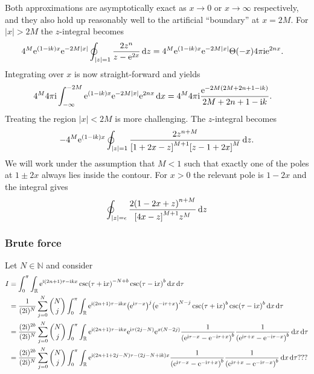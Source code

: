 \documentclass[english, parskip=full]{scrartcl}
\begin{document}
Both approximations are asymptotically exact as $x\rightarrow 0$ or $x\rightarrow \infty$ respectively, and they also hold up reasonably well to the artificial ``boundary'' at $x=2M$.
For $|x|>2M$ the $z$-integral becomes
\begin{align}
4^M \text{e}^{(1-\text{i} k)x} \text{e}^{-2M|x|} \oint_{|z|=1} \frac{2z^n}{z-\text{e}^{2x}}\,\text{d} z &= 4^M \text{e}^{(1-\text{i} k)x} \text{e}^{-2M|x|} \Theta(-x) 4\pi\text{i} \text{e}^{2nx}.
\end{align}
Integrating over $x$ is now straight-forward and yields
\begin{align}
4^M 4\pi\text{i} \int_{-\infty}^{-2M} \text{e}^{(1-\text{i} k)x} \text{e}^{-2M|x|} \text{e}^{2nx} \,\mathrm{d}x &= 4^M 4\pi\text{i} \frac{\text{e}^{-2M (2M + 2n + 1 - \text{i} k)}}{2M + 2n + 1 - \text{i} k}.
\end{align}
Treating the region $|x|<2M$ is more challenging.
The $z$-integral becomes
\begin{align}
-4^M \powe{(1-\i k) x} \oint_{|z|=1} \frac{2 z^{n+M}}{\klb*{1+2x-z}^{M+1} \klb*{z - 1 + 2x}^M} \,\d z.
\end{align}
We will work under the assumption that $M<1$ such that exactly one of the poles at $1 \pm 2x$ always lies inside the contour.
For $x>0$ the relevant pole is $1 - 2x$ and the integral gives
\begin{align}
\oint_{|z|=\epsilon} \frac{2 \kla*{1-2x + z}^{n+M} }{\klb*{4x - z}^{M+1} z^M}\,\d z
\end{align}
\subsubsection{Brute force}
Let $N\in\mathbb{N}$ and consider
\begin{align}
I &= \intx{0}{\pi}{\intr{\powe{\i (2n+1)\tau - \i kx} \csc (\tau + \i x)^{-N+b} \csc(\tau - \i x)^b}{x} }{\tau}\\
&= \frac{1}{(2\i)^N} \sum_{j=0}^N\binom{N}{j} \intx{0}{\pi}{\intr{\powe{\i (2n+1)\tau - \i kx} \kla*{\powe{\i\tau - x}}^j \kla*{\powe{-\i\tau + x}}^{N-j} \csc\kla*{\tau + \i x}^b \csc\kla*{\tau - \i x}^b}{x} }{\tau}\\
&= \frac{(2\i)^{2b}}{(2\i)^N} \sum_{j=0}^N\binom{N}{j} \intx{0}{\pi}{\intr{\powe{\i (2n+1)\tau - \i kx} \powe{\i\tau (2j-N)} \powe{x(N-2j)} \frac{1}{\kla*{\powe{\i\tau - x} - \powe{-\i\tau + x}}^b} \frac{1}{\kla*{\powe{\i\tau + x} - \powe{-\i\tau - x}}^b}}{x} }{\tau}\\
&= \frac{(2\i)^{2b}}{(2\i)^N} \sum_{j=0}^N\binom{N}{j} \intx{0}{\pi}{\intr{\powe{\i (2n+1+2j-N)\tau - (2j-N + \i k)x} \frac{1}{\kla*{\powe{\i\tau - x} - \powe{-\i\tau + x}}^b} \frac{1}{\kla*{\powe{\i\tau + x} - \powe{-\i\tau - x}}^b}}{x} }{\tau}???
\end{align}
\end{document}
